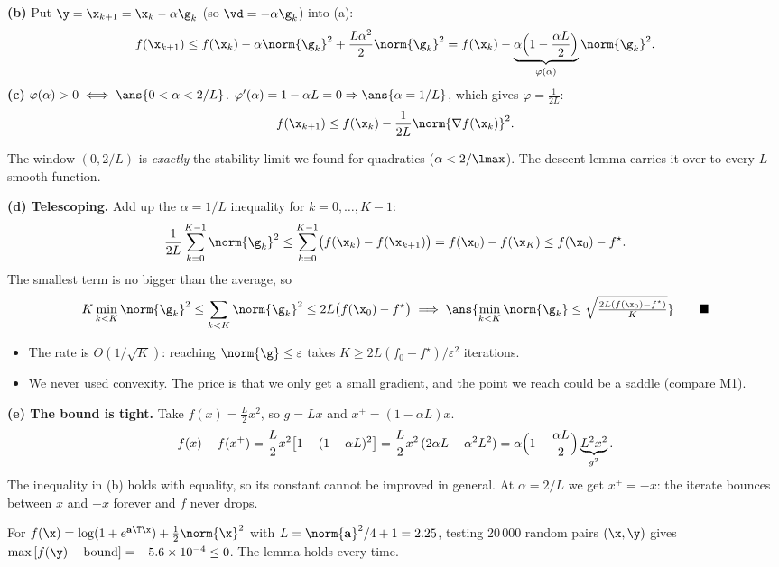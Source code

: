 \begin{frame}{}
  \textbf{(b)} Put $\y = \x_{k+1} = \x_k - \alpha\g_k$ (so $\vd = -\alpha\g_k$) into (a):
  \[
    f(\x_{k+1}) \le f(\x_k) - \alpha\norm{\g_k}^2 + \frac{L\alpha^2}{2}\norm{\g_k}^2
    = f(\x_k) - \underbrace{\alpha\Bigl(1 - \frac{\alpha L}{2}\Bigr)}_{\varphi(\alpha)}\norm{\g_k}^2 .
  \]
  \textbf{(c)} $\varphi(\alpha) > 0 \iff \ans{0 < \alpha < 2/L}$. \quad
  $\varphi'(\alpha) = 1 - \alpha L = 0 \Rightarrow \ans{\alpha = 1/L}$, which gives $\varphi = \tfrac1{2L}$:
  \[
    f(\x_{k+1}) \le f(\x_k) - \frac{1}{2L}\norm{\nabla f(\x_k)}^2 .
  \]
  \begin{keybox}
    The window $(0, 2/L)$ is \emph{exactly} the stability limit we found for quadratics ($\alpha < 2/\lmax$).
    The descent lemma carries it over to every $L$-smooth function.
  \end{keybox}
\end{frame}

\begin{frame}{}
  \textbf{(d) Telescoping.} Add up the $\alpha = 1/L$ inequality for $k = 0,\dots,K-1$:
  \[
    \frac1{2L}\sum_{k=0}^{K-1}\norm{\g_k}^2 \le \sum_{k=0}^{K-1}\bigl(f(\x_k) - f(\x_{k+1})\bigr)
    = f(\x_0) - f(\x_K) \le f(\x_0) - f^\star .
  \]
  The smallest term is no bigger than the average, so
  \[
    K\min_{k<K}\norm{\g_k}^2 \le \sum_{k<K}\norm{\g_k}^2 \le 2L\bigl(f(\x_0)-f^\star\bigr)
    \;\Longrightarrow\;
    \ans{\min_{k<K}\norm{\g_k} \le \sqrt{\tfrac{2L(f(\x_0)-f^\star)}{K}}} \qquad\blacksquare
  \]
  \small
  \begin{itemize}
    \item The rate is $O(1/\sqrt K)$: reaching $\norm{\g}\le\varepsilon$ takes $K \ge 2L(f_0-f^\star)/\varepsilon^2$ iterations.
    \item We never used convexity. The price is that we only get \alert{a small gradient}, and the point we reach could be
          a saddle (compare M1).
  \end{itemize}
\end{frame}

\begin{frame}{}
  \textbf{(e) The bound is tight.} Take $f(x) = \tfrac L2 x^2$, so $g = Lx$ and $x^+ = (1-\alpha L)x$.
  \[
    f(x) - f(x^+) = \frac L2 x^2\bigl[1 - (1-\alpha L)^2\bigr]
    = \frac L2 x^2\,(2\alpha L - \alpha^2L^2)
    = \alpha\Bigl(1 - \frac{\alpha L}{2}\Bigr)\underbrace{L^2x^2}_{g^2}.
  \]
  The inequality in (b) holds with \alert{equality}, so its constant cannot be improved in general.
  At $\alpha = 2/L$ we get $x^+ = -x$: the iterate bounces between $x$ and $-x$ forever and $f$ never drops.

  \vspace{4pt}
  \begin{keybox}
    For $f(\x) = \log(1+e^{\mathbf a\T\x}) + \tfrac12\norm{\x}^2$ with $L = \norm{\mathbf a}^2/4 + 1 = 2.25$,
    testing 20\,000 random pairs $(\x,\y)$ gives
    $\max\,[f(\y) - \text{bound}] = -5.6\times10^{-4} \le 0$. The lemma holds every time.
  \end{keybox}
\end{frame}
